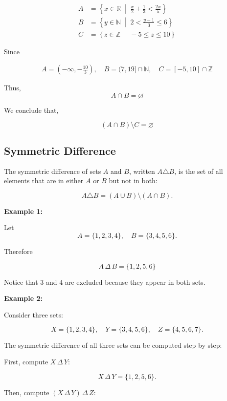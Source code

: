 \documentclass[12pt,a4paper,openany]{article}
\begin{document}
$$
\begin{aligned}
A &= \left\{ x \in \mathbb{R} \;\middle|\; \frac{x}{2} + \frac{1}{3} < \frac{2x}{5} \right\} \\
B &= \left\{ y \in \mathbb{N} \;\middle|\; 2 < \frac{y-1}{3} \le 6 \right\} \\
C &= \left\{ z \in \mathbb{Z} \;\middle|\; -5 \leq z \leq 10 \right\}
\end{aligned}
$$

Since

$$
\begin{aligned}
A = \left(-\infty, -\frac{10}{3}\right), \quad
B = (7, 19] \cap \mathbb{N}, \quad 
C = [-5, 10] \cap \mathbb{Z}
\end{aligned}
$$

Thus, 
$$
A \cap B = \varnothing
$$

We conclude that,

$$
\boxed{(A \cap B) \setminus C = \varnothing}
$$

\subsection{Symmetric Difference}\label{SymmetricDifference}

The symmetric difference of sets $A$ and $B$, written $A \triangle B$, is the set of all elements that are in either $A$ or $B$ but not in both:

$$
A \triangle B =  (A \cup B) \setminus (A \cap B).
$$

\textbf{Example 1:}

Let  
\[
A = \{1, 2, 3, 4\}, \quad B = \{3, 4, 5, 6\}.
\]

Therefore

\[
\boxed{A \,\Delta\, B = \{1, 2, 5, 6\}}
\]

Notice that $3$ and $4$ are excluded because they appear in both sets.

\vspace{1em}

\textbf{Example 2:}

Consider three sets:

\[
X = \{1, 2, 3, 4\}, \quad 
Y = \{3, 4, 5, 6\}, \quad
Z = \{4, 5, 6, 7\}.
\]

The symmetric difference of all three sets can be computed step by step:

First, compute $X \,\Delta\, Y$:

\[
X \,\Delta\, Y = \{1, 2, 5, 6\}.
\]

Then, compute $(X \,\Delta\, Y) \,\Delta\, Z$:
\end{document}
